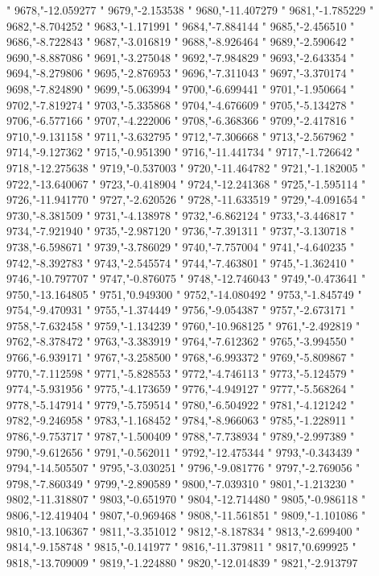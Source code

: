 "
9678,"-12.059277
"
9679,"-2.153538
"
9680,"-11.407279
"
9681,"-1.785229
"
9682,"-8.704252
"
9683,"-1.171991
"
9684,"-7.884144
"
9685,"-2.456510
"
9686,"-8.722843
"
9687,"-3.016819
"
9688,"-8.926464
"
9689,"-2.590642
"
9690,"-8.887086
"
9691,"-3.275048
"
9692,"-7.984829
"
9693,"-2.643354
"
9694,"-8.279806
"
9695,"-2.876953
"
9696,"-7.311043
"
9697,"-3.370174
"
9698,"-7.824890
"
9699,"-5.063994
"
9700,"-6.699441
"
9701,"-1.950664
"
9702,"-7.819274
"
9703,"-5.335868
"
9704,"-4.676609
"
9705,"-5.134278
"
9706,"-6.577166
"
9707,"-4.222006
"
9708,"-6.368366
"
9709,"-2.417816
"
9710,"-9.131158
"
9711,"-3.632795
"
9712,"-7.306668
"
9713,"-2.567962
"
9714,"-9.127362
"
9715,"-0.951390
"
9716,"-11.441734
"
9717,"-1.726642
"
9718,"-12.275638
"
9719,"-0.537003
"
9720,"-11.464782
"
9721,"-1.182005
"
9722,"-13.640067
"
9723,"-0.418904
"
9724,"-12.241368
"
9725,"-1.595114
"
9726,"-11.941770
"
9727,"-2.620526
"
9728,"-11.633519
"
9729,"-4.091654
"
9730,"-8.381509
"
9731,"-4.138978
"
9732,"-6.862124
"
9733,"-3.446817
"
9734,"-7.921940
"
9735,"-2.987120
"
9736,"-7.391311
"
9737,"-3.130718
"
9738,"-6.598671
"
9739,"-3.786029
"
9740,"-7.757004
"
9741,"-4.640235
"
9742,"-8.392783
"
9743,"-2.545574
"
9744,"-7.463801
"
9745,"-1.362410
"
9746,"-10.797707
"
9747,"-0.876075
"
9748,"-12.746043
"
9749,"-0.473641
"
9750,"-13.164805
"
9751,"0.949300
"
9752,"-14.080492
"
9753,"-1.845749
"
9754,"-9.470931
"
9755,"-1.374449
"
9756,"-9.054387
"
9757,"-2.673171
"
9758,"-7.632458
"
9759,"-1.134239
"
9760,"-10.968125
"
9761,"-2.492819
"
9762,"-8.378472
"
9763,"-3.383919
"
9764,"-7.612362
"
9765,"-3.994550
"
9766,"-6.939171
"
9767,"-3.258500
"
9768,"-6.993372
"
9769,"-5.809867
"
9770,"-7.112598
"
9771,"-5.828553
"
9772,"-4.746113
"
9773,"-5.124579
"
9774,"-5.931956
"
9775,"-4.173659
"
9776,"-4.949127
"
9777,"-5.568264
"
9778,"-5.147914
"
9779,"-5.759514
"
9780,"-6.504922
"
9781,"-4.121242
"
9782,"-9.246958
"
9783,"-1.168452
"
9784,"-8.966063
"
9785,"-1.228911
"
9786,"-9.753717
"
9787,"-1.500409
"
9788,"-7.738934
"
9789,"-2.997389
"
9790,"-9.612656
"
9791,"-0.562011
"
9792,"-12.475344
"
9793,"-0.343439
"
9794,"-14.505507
"
9795,"-3.030251
"
9796,"-9.081776
"
9797,"-2.769056
"
9798,"-7.860349
"
9799,"-2.890589
"
9800,"-7.039310
"
9801,"-1.213230
"
9802,"-11.318807
"
9803,"-0.651970
"
9804,"-12.714480
"
9805,"-0.986118
"
9806,"-12.419404
"
9807,"-0.969468
"
9808,"-11.561851
"
9809,"-1.101086
"
9810,"-13.106367
"
9811,"-3.351012
"
9812,"-8.187834
"
9813,"-2.699400
"
9814,"-9.158748
"
9815,"-0.141977
"
9816,"-11.379811
"
9817,"0.699925
"
9818,"-13.709009
"
9819,"-1.224880
"
9820,"-12.014839
"
9821,"-2.913797
